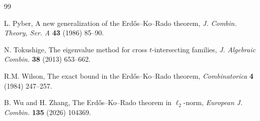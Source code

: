 \documentclass[11pt]{article}
\numberwithin{equation}{section}
\begin{document}
\begin{thebibliography}{99}


 L. Pyber,
A new generalization of the Erd\H{o}s--Ko--Rado theorem,
{\em J. Combin. Theory, Ser. A} {\bf 43} (1986) 85--90.



 N. Tokushige,
The eigenvalue method for cross $t$-intersecting families,
{\em J. Algebraic Combin.} {\bf 38} (2013) 653--662.



 R.M. Wilson,
The exact bound in the Erd\H{o}s--Ko--Rado theorem,
{\em Combinatorica} {\bf 4} (1984) 247--257.

 B. Wu and H. Zhang,
The Erd\H{o}s--Ko--Rado theorem in $\ell_2$-norm,
{\em European J. Combin.} {\bf 135} (2026) 104369.


\end{thebibliography}
\end{document}
